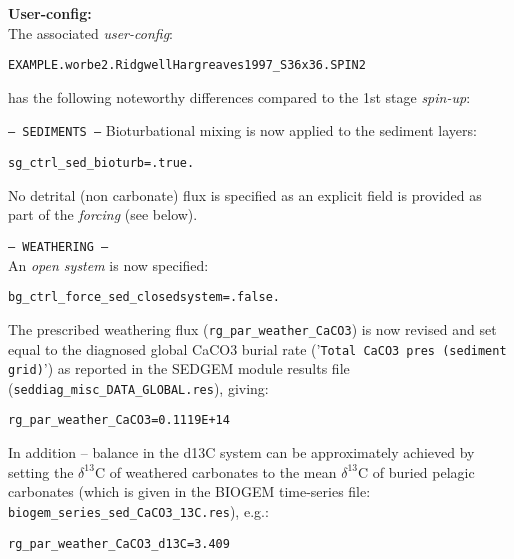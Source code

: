 \documentclass[10pt,twoside]{article}
\begin{document}
\noindent \textbf{User-config:} 
\\ The associated \textit{user-config}:
\vspace{-10pt}\begin{verbatim}EXAMPLE.worbe2.RidgwellHargreaves1997_S36x36.SPIN2\end{verbatim}\vspace{-10pt}
has the following noteworthy differences compared to the 1st stage \textit{spin-up}:

\begin{compactitem}
                \item \texttt{--- SEDIMENTS ---}
Bioturbational mixing is now applied to the sediment layers:
                \vspace{-5pt}\begin{verbatim}
sg_ctrl_sed_bioturb=.true.
                \end{verbatim}\vspace{-5pt}
No detrital (non carbonate) flux is specified as an explicit field is provided as part of the \textit{forcing} (see below).
                \item \texttt{--- WEATHERING ---}
                \\ An \textit{open  system} is now specified:
\vspace{-5pt}\begin{verbatim}
bg_ctrl_force_sed_closedsystem=.false.
                \end{verbatim}\vspace{-5pt}
The prescribed weathering flux (\texttt{rg\_par\_weather\_CaCO3}) is now revised and set equal to the diagnosed global CaCO3 burial rate ('\texttt{Total CaCO3 pres (sediment grid)}') as reported in the SEDGEM module results file (\texttt{seddiag\_misc\_DATA\_GLOBAL.res}), giving:
\vspace{-5pt}\begin{verbatim}
rg_par_weather_CaCO3=0.1119E+14
                \end{verbatim}\vspace{-5pt}
                In addition -- balance in the d13C system can be approximately achieved by setting the $\delta^{13}$C of weathered carbonates to the mean $\delta^{13}$C of buried pelagic carbonates (which is given in the BIOGEM time-series file: \texttt{biogem\_series\_sed\_CaCO3\_13C.res}), e.g.:
                \vspace{-5pt}\begin{verbatim}
rg_par_weather_CaCO3_d13C=3.409
                \end{verbatim}\vspace{-5pt}
        \end{compactitem}
\end{document}
